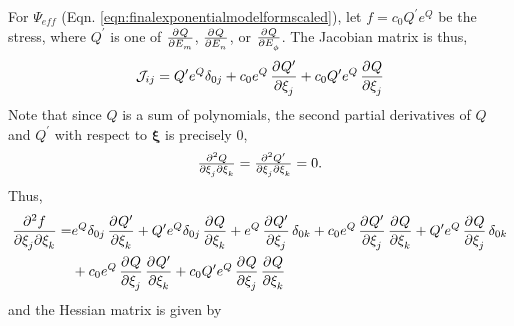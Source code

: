 	For $\Psi_{eff}$ (Eqn. \ref{eqn:finalexponentialmodelformscaled}), let $f = c_0Q^\prime e^{Q}$ be the stress, where $Q^\prime$ is one of $\pd{Q}{E_m}$, $\pd{Q}{E_n}$, or $\pd{Q}{E_\phi}$. The Jacobian matrix is thus, 
\begin{equation}	
\mathcal{J}_{ij} = Q^\prime e^Q \delta_{0j} + c_0 e^Q \dpd{Q^\prime}{\xi_j}+ c_0Q^\prime e^Q \dpd{Q}{\xi_j}
\end{equation}
Note that since $Q$ is a sum of polynomials, the second partial derivatives of $Q$ and $Q^\prime$ with respect to $\mathbf{\xi}$ is precisely 0,
\begin{equation}		
\md{Q}{2}{\xi_j}{}{\xi_k}{}  = \md{Q^\prime}{2}{\xi_j}{}{\xi_k}{} = 0.
\end{equation}
Thus,
\begin{equation}	
\begin{aligned}
\dmd{f}{2}{\xi_j}{}{\xi_k}{} =& e^Q \delta_{0j}\dpd{Q^\prime}{\xi_k} + Q^\prime e^Q \delta_{0j}\dpd{Q}{\xi_k} 
+  e^Q\dpd{Q^\prime}{\xi_j}\delta_{0k} + c_0 e^Q\dpd{Q^\prime}{\xi_j}\dpd{Q}{\xi_k} 
+ Q^\prime e^Q \dpd{Q}{\xi_j}\delta_{0k} 	\\
&+ c_0e^Q \dpd{Q}{\xi_j}\dpd{Q^\prime}{\xi_k}
+ c_0Q^\prime e^Q \dpd{Q}{\xi_j}\dpd{Q}{\xi_k} 
\end{aligned}
\end{equation}
and the Hessian matrix is given by


